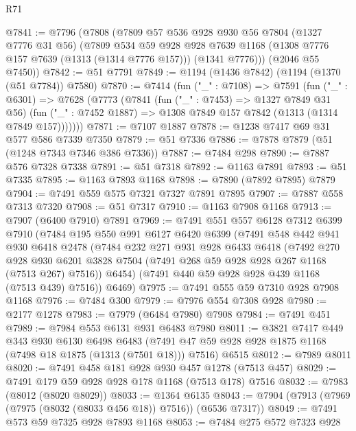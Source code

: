 \begin{lexlean}{R71}
\begin{coremodule}
@7841 := @7796
    (@7808
      (@7809
        @57
        @536
        @928
        @930
        @56
        @7804
        (@1327 @7776 @31 @56)
        (@7809
          @534
          @59
          @928
          @928
          @7639
          @1168
          (@1308 @7776 @157 @7639 (@1313 (@1314 @7776 @157)))
          (@1341 @7776)))
      (@2046 @55 @7450))
@7842 := @51 @7791
@7849 := @1194 (@1436 @7842) (@1194 (@1370 (@51 @7784)) @7580)
@7870 := @7414
    (fun ("_" : @7108) =>
    @7591
      (fun ("_" : @6301) =>
      @7628
        (@7773
          (@7841
            (fun ("_" : @7453) => @1327 @7849 @31 @56)
            (fun ("_" : @7452 @1887) => @1308 @7849 @157 @7842 (@1313 (@1314 @7849 @157)))))))
@7871 := @7107 @1887
@7878 := @1238 @7417 @69 @31 @577 @586 @7339 @7350
@7879 := @51 @7336
@7886 := @7878 @7879 (@51 (@1248 @7343 @7346 @386 @7336))
@7887 := @7484 @298
@7890 := @7887 @576 @7328 @7338
@7891 := @51 @7318
@7892 := @1163 @7891
@7893 := @51 @7335
@7895 := @1163 @7893 @1168
@7898 := @7890 (@7892 @7895) @7879
@7904 := @7491 @559 @575 @7321 @7327 @7891 @7895
@7907 := @7887 @558 @7313 @7320
@7908 := @51 @7317
@7910 := @1163 @7908 @1168
@7913 := @7907 (@6400 @7910) @7891
@7969 := @7491
    @551
    @557
    @6128
    @7312
    @6399
    @7910
    (@7484
      @195
      @550
      @991
      @6127
      @6420
      @6399
      (@7491
        @548
        @442
        @941
        @930
        @6418
        @2478
        (@7484
          @232
          @271
          @931
          @928
          @6433
          @6418
          (@7492
            @270
            @928
            @930
            @6201
            @3828
            @7504
            (@7491 @268 @59 @928 @928 @267 @1168 (@7513 @267) @7516))
          @6454)
        (@7491 @440 @59 @928 @928 @439 @1168 (@7513 @439) @7516))
      @6469)
@7975 := @7491 @555 @59 @7310 @928 @7908 @1168
@7976 := @7484 @300
@7979 := @7976 @554 @7308 @928
@7980 := @2177 @1278
@7983 := @7979 (@6484 @7980) @7908
@7984 := @7491 @451
@7989 := @7984 @553 @6131 @931 @6483 @7980
@8011 := @3821
    @7417
    @449
    @343
    @930
    @6130
    @6498
    @6483
    (@7491 @47 @59 @928 @928 @1875 @1168 (@7498 @18 @1875 (@1313 (@7501 @18))) @7516)
    @6515
@8012 := @7989 @8011
@8020 := @7491 @458 @181 @928 @930 @457 @1278 (@7513 @457)
@8029 := @7491 @179 @59 @928 @928 @178 @1168 (@7513 @178) @7516
@8032 := @7983 (@8012 (@8020 @8029))
@8033 := @1364 @6135
@8043 := @7904 (@7913 (@7969 (@7975 (@8032 (@8033 @456 @18)) @7516)) (@6536 @7317))
@8049 := @7491 @573 @59 @7325 @928 @7893 @1168
@8053 := @7484 @275 @572 @7323 @928

\end{coremodule}
\end{lexlean}
